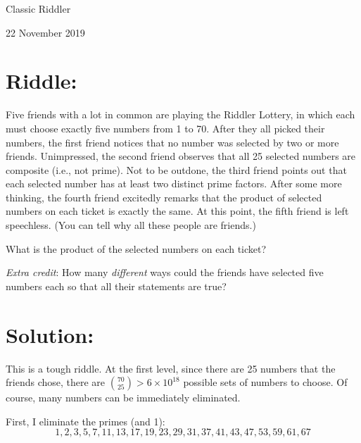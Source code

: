 \documentclass{article}
\begin{document}
\pagestyle{empty} %


\begin{center}
{\LARGE Classic Riddler}

\vspace{0.15in}

{\Large 22 November 2019}
\end{center}


\section*{Riddle:}

Five friends with a lot in common are playing the Riddler Lottery, in which each must choose exactly five numbers from 1 to 70.
After they all picked their numbers, the first friend notices that no number was selected by two or more friends.
Unimpressed, the second friend observes that all 25 selected numbers are composite (i.e., not prime).
Not to be outdone, the third friend points out that each selected number has at least two distinct prime factors.
After some more thinking, the fourth friend excitedly remarks that the product of selected numbers on each ticket is exactly the same.
At this point, the fifth friend is left speechless.
(You can tell why all these people are friends.)

What is the product of the selected numbers on each ticket?

\textit{Extra credit}: How many \textit{different} ways could the friends have selected five numbers each so that all their statements are true?


\section*{Solution:}

This is a tough riddle.
At the first level, since there are 25 numbers that the friends chose, there are $\binom{70}{25}> 6\times10^{18}$ possible sets of numbers to choose.
Of course, many numbers can be immediately eliminated.

First, I eliminate the primes (and 1):
\begin{equation*}
1,2,3,5,7,11,13,17,19,23,29,31,37,41,43,47,53,59,61,67
\end{equation*}
\end{document}
